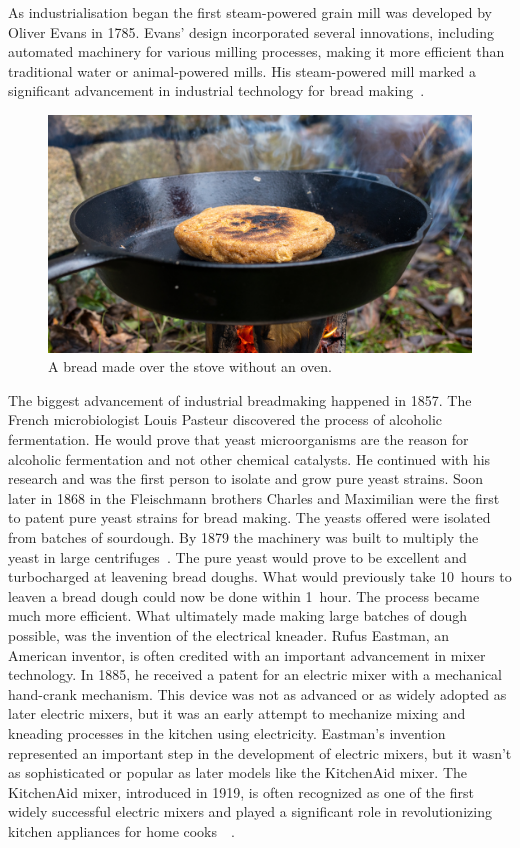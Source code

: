As industrialisation began the first steam-powered grain mill was developed by
Oliver Evans in \num{1785}. Evans' design incorporated several innovations,
including automated machinery for various milling processes, making it more
efficient than traditional water or animal-powered mills. His steam-powered
mill marked a significant advancement in industrial technology for bread
making~\cite{evans+mill}.

\begin{figure}[ht]
  \includegraphics[width=\textwidth]{sourdough-stove}
  \caption{A bread made over the stove without an oven.}%
  \label{sourdough-stove}
\end{figure}

The biggest advancement of industrial breadmaking happened in \num{1857}.
The French microbiologist Louis Pasteur discovered
the process of alcoholic fermentation. He would prove that
yeast microorganisms are the reason for alcoholic fermentation
and not other chemical catalysts. He continued with his research and
was the first person to isolate and grow pure yeast strains.
Soon later in \num{1868} in the Fleischmann brothers Charles
and Maximilian were the first to patent pure yeast strains
for bread making. The yeasts offered
were isolated from batches of sourdough. By \num{1879} the machinery was built
to multiply the yeast in large centrifuges~\cite{fleischmann+history}.
The pure yeast would prove to be excellent and turbocharged
at leavening bread doughs. What would previously take 10~hours
to leaven a bread dough could now be done within 1~hour.
The process became much more efficient. What ultimately made making large
batches of dough possible, was the invention of the electrical kneader.  Rufus
Eastman, an American inventor, is often credited with an important advancement
in mixer technology. In \num{1885}, he received a patent for an electric mixer
with a mechanical hand-crank mechanism.  This device was not as advanced or as
widely adopted as later electric mixers, but it was an early attempt to
mechanize mixing and kneading processes in the kitchen using electricity.
Eastman's invention represented an important step in the development of
electric mixers, but it wasn't as sophisticated or popular as later models
like the KitchenAid mixer. The KitchenAid mixer, introduced in \num{1919}, is
often recognized as one of the first widely successful electric mixers and
played a significant role in revolutionizing kitchen appliances for home
cooks~\cite{first+mixer}~\cite{kitchenaid+history}.

